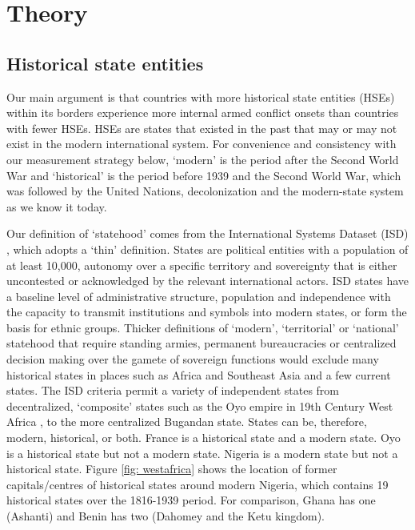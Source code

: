     
\section{Theory}

\subsection{Historical state entities}

Our main argument is that countries with more historical state entities (HSEs)
within its borders experience more internal armed conflict onsets than countries
with fewer HSEs. HSEs are states that existed in the past that may or may not
exist in the modern international system. For convenience and consistency with
our measurement strategy below, `modern' is the period after the Second World
War and `historical' is the period before 1939 and the Second World War, which
was followed by the United Nations, decolonization and the modern-state system
as we know it today. 

Our definition of `statehood' comes from the International Systems Dataset (ISD)
\citep{Butcher2020}, which adopts a `thin' definition. States are
political entities with a population of at least 10,000, autonomy over a
specific territory and sovereignty that is either uncontested or acknowledged by
the relevant international actors. ISD states have a baseline level of
administrative structure, population and independence with the capacity to
transmit institutions and symbols into modern states, or form the basis for
ethnic groups. Thicker definitions of `modern', `territorial' or `national'
statehood that require standing armies, permanent bureaucracies or centralized
decision making over the gamete of sovereign functions would exclude many
historical states in places such as Africa and Southeast Asia
\citep{Spruyt1998} and a few current states. The ISD criteria permit a
variety of independent states from decentralized, `composite' states
\citep{Nexon2009} such as the Oyo empire in 19th Century West Africa
\citep{Law1977}, to the more centralized Bugandan state. States can be,
therefore, modern, historical, or both. France is a historical state and a
modern state. Oyo is a historical state but not a modern state. Nigeria is a
modern state but not a historical state. Figure \ref{fig: westafrica} shows the
location of former capitals/centres of historical states around modern Nigeria, which contains 19 historical
states over the 1816-1939 period. For comparison, Ghana has one (Ashanti) and  Benin has two (Dahomey and the Ketu kingdom). 

